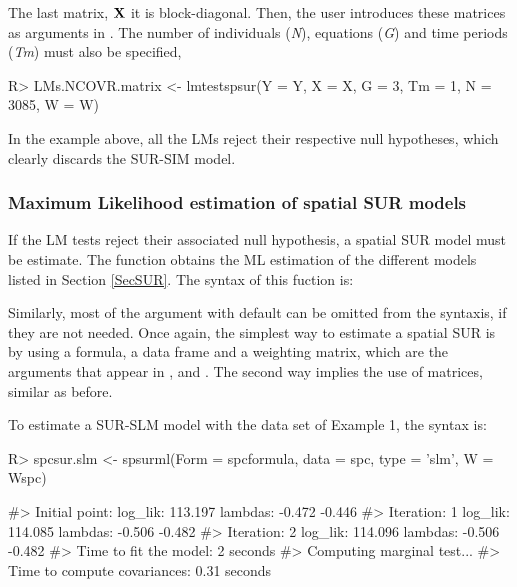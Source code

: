 \documentclass[article]{jss}
\begin{document}
The last matrix, \(\bf X\) it is block-diagonal. Then, the user introduces these matrices as arguments in . The number of individuals (\emph{N}), equations (\emph{G}) and time periods (\emph{Tm}) must also be specified,

\begin{CodeChunk}

\begin{CodeInput}
R> LMs.NCOVR.matrix <- lmtestspsur(Y = Y, X = X, G = 3, Tm = 1, N = 3085, W = W)
\end{CodeInput}
\end{CodeChunk}

In the example above, all the LMs reject their respective null hypotheses, which clearly discards the SUR-SIM model.

\hypertarget{ml}{%
\subsubsection{Maximum Likelihood estimation of spatial SUR models}\label{ml}}

If the LM tests reject their associated null hypothesis, a spatial SUR model must be estimate. The function  obtains the ML estimation of the different models listed in Section \ref{SecSUR}. The syntax of this fuction is:


Similarly, most of the argument with  default can be omitted from the syntaxis, if they are not needed. Once again, the simplest way to estimate a spatial SUR is by using a formula, a data frame and a weighting matrix, which are the arguments that appear in ,  and . The second way implies the use of matrices, similar as before.

To estimate a SUR-SLM model with the data set of Example 1, the syntax is:

\begin{CodeChunk}

\begin{CodeInput}
R> spcsur.slm <- spsurml(Form = spcformula, data = spc, type = 'slm', W = Wspc)
\end{CodeInput}

\begin{CodeOutput}
#> Initial point:   log_lik:  113.197  lambdas:  -0.472 -0.446 
#> Iteration:  1   log_lik:  114.085  lambdas:  -0.506 -0.482 
#> Iteration:  2   log_lik:  114.096  lambdas:  -0.506 -0.482 
#> Time to fit the model:  2  seconds
#> Computing marginal test... 
#> Time to compute covariances:  0.31  seconds
\end{CodeOutput}
\end{CodeChunk}
\end{document}
